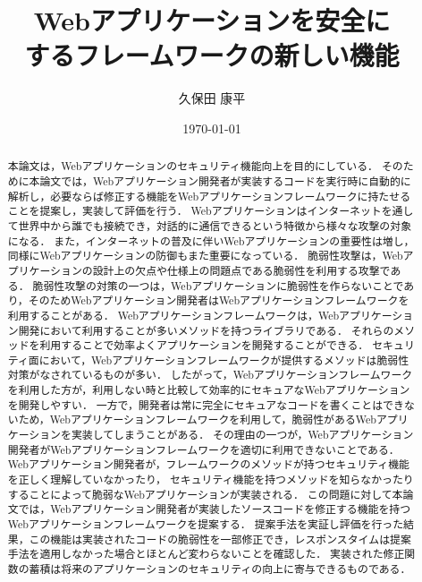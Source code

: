 \documentclass[a4paper,12pt]{jreport}
\title{Webアプリケーションを安全に\\するフレームワークの新しい機能}
\author{久保田 康平}
\date{\today}
\begin{document}
\maketitle

\begin{abstract}
本論文は，Webアプリケーションのセキュリティ機能向上を目的にしている．
そのために本論文では，Webアプリケーション開発者が実装するコードを実行時に自動的に解析し，必要ならば修正する機能をWebアプリケーションフレームワークに持たせることを提案し，実装して評価を行う．
Webアプリケーションはインターネットを通して世界中から誰でも接続でき，対話的に通信できるという特徴から様々な攻撃の対象になる．
また，インターネットの普及に伴いWebアプリケーションの重要性は増し，同様にWebアプリケーションの防御もまた重要になっている．
脆弱性攻撃は，Webアプリケーションの設計上の欠点や仕様上の問題点である脆弱性を利用する攻撃である．
脆弱性攻撃の対策の一つは，Webアプリケーションに脆弱性を作らないことであり，そのためWebアプリケーション開発者はWebアプリケーションフレームワークを利用することがある．
Webアプリケーションフレームワークは，Webアプリケーション開発において利用することが多いメソッドを持つライブラリである．
それらのメソッドを利用することで効率よくアプリケーションを開発することができる．
セキュリティ面において，Webアプリケーションフレームワークが提供するメソッドは脆弱性対策がなされているものが多い．
したがって，Webアプリケーションフレームワークを利用した方が，利用しない時と比較して効率的にセキュアなWebアプリケーションを開発しやすい．
一方で，開発者は常に完全にセキュアなコードを書くことはできないため，Webアプリケーションフレームワークを利用して，脆弱性があるWebアプリケーションを実装してしまうことがある．
その理由の一つが，Webアプリケーション開発者がWebアプリケーションフレームワークを適切に利用できないことである．
Webアプリケーション開発者が，フレームワークのメソッドが持つセキュリティ機能を正しく理解していなかったり，
セキュリティ機能を持つメソッドを知らなかったりすることによって脆弱なWebアプリケーションが実装される．
この問題に対して本論文では，Webアプリケーション開発者が実装したソースコードを修正する機能を持つWebアプリケーションフレームワークを提案する．
提案手法を実証し評価を行った結果，この機能は実装されたコードの脆弱性を一部修正でき，レスポンスタイムは提案手法を適用しなかった場合とほとんど変わらないことを確認した．
実装された修正関数の蓄積は将来のアプリケーションのセキュリティの向上に寄与できるものである．
\end{abstract}

\tableofcontents
\listoffigures
\listoftables
\newpage
{}
\end{document}
